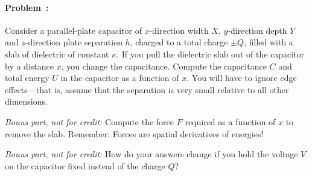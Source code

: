 \documentclass[12pt]{article}
\begin{document}
\paragraph{Problem~\theproblem:}%
Consider a parallel-plate capacitor of $x$-direction width $X$,
$y$-direction depth $Y$ and $z$-direction plate
separation $h$, charged to a total charge $\pm Q$, filled with a slab of
dielectric of constant $\kappa$.  If you pull
the dielectric slab out of the capacitor by a distance $x$, you change
the capacitance. Compute the capacitance $C$ and
total energy $U$ in the capacitor as a function of $x$. You will have to
ignore edge effects---that is, assume that the separation is very small
relative to all other dimensions.

\textsl{Bonus part, not for credit:} Compute the
force $F$ required as a function of $x$ to remove the slab.
Remember: Forces are spatial derivatives of energies!

\textsl{Bonus part, not for credit:} How do your answers change if you
hold the voltage $V$ on the capacitor fixed instead of the charge $Q$?
\end{document}
